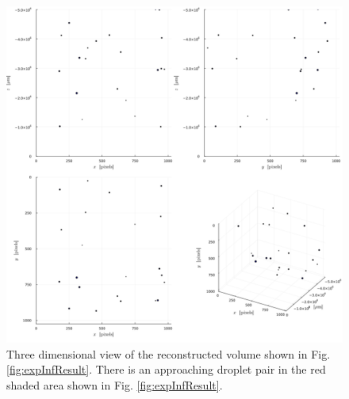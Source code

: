 \begin{figure}[H]
    \centering
    \includegraphics[width=0.8\linewidth]{./Figure/4_Results/exp/3dview.png}
    \caption{Three dimensional view of the reconstructed volume shown in Fig. \ref{fig:expInfResult}. There is an approaching droplet pair in the red shaded area shown in Fig. \ref{fig:expInfResult}.}
    \label{fig:3dview}
\end{figure}